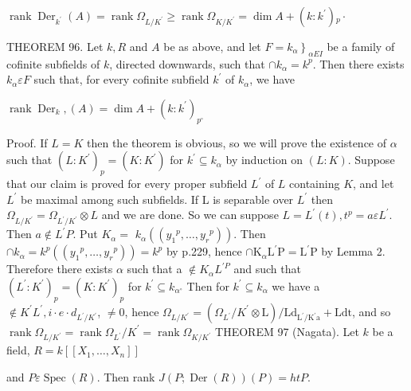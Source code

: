$\operatorname{rank} \operatorname{Der}_{k^{\prime}}(A)=\operatorname{rank} \Omega_{L / K^{\prime}} \geqslant \operatorname{rank} \Omega_{K / K^{\prime}}=\operatorname{dim} A+\left(k: k^{\prime}\right){ }_{p} \cdot$

THEOREM 96. Let $k, R$ and $A$ be as above, and let $\left.F=k_{\alpha}\right\}_{\alpha E I}$ be a family of cofinite subfields of $k$, directed downwards, such that $\cap k_{\alpha}=k^{p}$. Then there exists $k_{\alpha} \varepsilon F$ such that, for every cofinite subfield $k^{\prime}$ of $k_{\alpha}$, we have

$\operatorname{rank} \operatorname{Der}_{k},(A)=\operatorname{dim} A+\left(k: k^{\prime}\right)_{p^{\circ}}$

Proof. If $L=K$ then the theorem is obvious, so we will prove the existence of $\alpha$ such that $\left(L: K^{\prime}\right)_{p}=\left(K: K^{\prime}\right)$ for $k^{\prime} \subseteq k_{\alpha}$ by induction on $(L: K)$. Suppose that our claim is proved for every proper subfield $L^{\prime}$ of $L$ containing $K$, and let $L^{\prime}$ be maximal among such subfields. If L is separable over $L^{\prime}$ then $\Omega_{L / K^{\prime}}=\Omega_{L^{\prime} / K^{\prime}} \otimes L$ and we are done. So we can suppose $L=L^{\prime}(t), t^{p}=a \varepsilon L^{\prime}$. Then $a \notin L^{\prime} P$. Put $K_{\alpha}=$ $k_{\alpha}\left(\left(y_{1}{ }^{p}, \ldots, y_{r}{ }^{p}\right)\right) .$ Then $\cap k_{\alpha}=k^{p}\left(\left(y_{1}{ }^{p}, \ldots, y_{r}{ }^{p}\right)\right)=k^{p}$ by p.229, hence $\cap \mathrm{K}_{\alpha} \mathrm{L}^{\prime} \mathrm{P}=\mathrm{L}^{\prime} \mathrm{P}$ by Lemma 2. Therefore there exists $\alpha$ such that a $\notin K_{\alpha} L^{\prime P}$ and such that $\left(L^{\prime}: K^{\prime}\right)_{p}=\left(K: K^{\prime}\right)_{p}$ for $k^{\prime} \subseteq k_{\alpha^{\circ}}$ Then for $k^{\prime} \subseteq k_{\alpha}$ we have a $\notin K^{\prime} L^{\prime}, i \cdot e \cdot d_{L^{\prime} / K^{\prime}}$, $\neq 0$, hence $\Omega_{L / K^{\prime}}=\left(\Omega_{L^{\prime}} / K^{\prime} \otimes \mathrm{L}\right) / \mathrm{Ld}_{\mathrm{L}^{\prime} / \mathrm{K}^{\prime} \mathrm{a}}+\mathrm{Ldt}$, and so $\operatorname{rank} \Omega_{L / K^{\prime}}=\operatorname{rank} \Omega_{L^{\prime}} / K^{\prime}=\operatorname{rank} \Omega_{K / K^{\prime}}$ THEOREM 97 (Nagata). Let $k$ be a field, $R=k\left[\left[X_{1}, \ldots, X_{n}\right]\right]$

and $P \varepsilon \operatorname{Spec}(R)$. Then rank $J(P ; \operatorname{Der}(R))(P)=h t P$.


